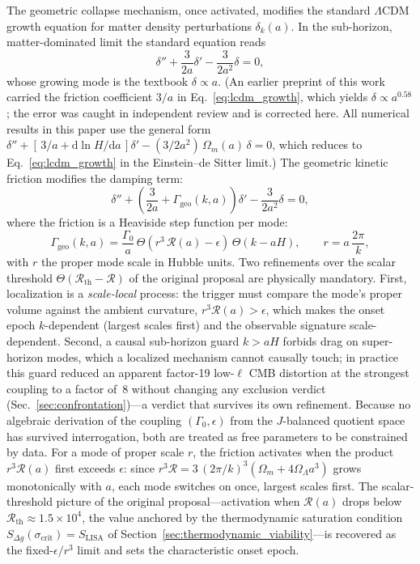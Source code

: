 \documentclass[aps,prd,twocolumn,superscriptaddress,nofootinbib]{revtex4-2}
\theoremstyle{definition}
\theoremstyle{remark}
\newcommand{\Rth}{\mathcal{R}_{\mathrm{th}}}
\newcommand{\sigcrit}{\sigma_{\mathrm{crit}}}
\begin{document}
The geometric collapse mechanism, once activated, modifies the standard
$\Lambda$CDM growth equation for matter density perturbations
$\delta_k(a)$. In the sub-horizon, matter-dominated limit the standard
equation reads
\begin{equation}
\delta'' + \frac{3}{2a}\delta' - \frac{3}{2a^2}\delta = 0,
\label{eq:lcdm_growth}
\end{equation}
whose growing mode is the textbook $\delta \propto a$. (An earlier
preprint of this work carried the friction coefficient $3/a$ in
Eq.~\eqref{eq:lcdm_growth}, which yields $\delta \propto a^{0.58}$;
the error was caught in independent review and is corrected here. All
numerical results in this paper use the general form
$\delta'' + [\,3/a + \mathrm{d}\ln H/\mathrm{d}a\,]\delta' -
(3/2a^2)\,\Omega_m(a)\,\delta = 0$, which reduces to
Eq.~\eqref{eq:lcdm_growth} in the Einstein--de Sitter limit.) The
geometric kinetic friction modifies the damping term:
\begin{equation}
\delta'' + \left(\frac{3}{2a} + \Gamma_{\mathrm{geo}}(k,a)\right)\delta'
- \frac{3}{2a^2}\delta = 0,
\label{eq:modified_growth}
\end{equation}
where the friction is a Heaviside step function per mode:
\begin{equation}
\Gamma_{\mathrm{geo}}(k,a) = \frac{\Gamma_0}{a}\,
\Theta\!\left(r^3\,\mathcal{R}(a) - \epsilon\right)\,
\Theta\!\left(k - aH\right),
\qquad r = a\,\frac{2\pi}{k},
\label{eq:geometric_friction}
\end{equation}
with $r$ the proper mode scale in Hubble units. Two refinements over the
scalar threshold $\Theta(\Rth - \mathcal{R})$ of the original proposal
are physically mandatory. First, localization is a \emph{scale-local}
process: the trigger must compare the mode's proper volume against the
ambient curvature, $r^3 \mathcal{R}(a) > \epsilon$, which makes the
onset epoch $k$-dependent (largest scales first) and the observable
signature scale-dependent. Second, a causal sub-horizon guard
$k > aH$ forbids drag on super-horizon modes, which a localized
mechanism cannot causally touch; in practice this guard reduced an
apparent factor-19 low-$\ell$ CMB distortion at the strongest coupling
to a factor of~8 without changing any exclusion verdict
(Sec.~\ref{sec:confrontation})---a verdict that survives its own
refinement. Because no algebraic derivation of the coupling
$(\Gamma_0, \epsilon)$ from the $J$-balanced quotient space has survived
interrogation, both are treated as free parameters to be constrained by
data.
For a mode of proper scale $r$, the friction activates when the
product $r^3 \mathcal{R}(a)$ first exceeds $\epsilon$: since
$r^3\mathcal{R} = 3\,(2\pi/k)^3(\Omega_m + 4\Omega_\Lambda a^3)$ grows
monotonically with $a$, each mode switches on once, largest scales
first. The scalar-threshold picture of the original
proposal---activation when $\mathcal{R}(a)$ drops below
$\Rth \approx 1.5 \times 10^4$, the value anchored by the thermodynamic
saturation condition $S_{\Delta g}(\sigcrit) = S_{\mathrm{LISA}}$ of
Section~\ref{sec:thermodynamic_viability}---is recovered as the
fixed-$\epsilon/r^3$ limit and sets the characteristic onset epoch.
\end{document}
